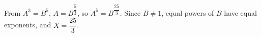 From $A^3=B^5$, $A=B^{\dfrac{5}{3}}$, so $A^5=B^{\dfrac{25}{3}}$. Since $B\ne1$, equal powers of $B$ have equal exponents, and $X=\boxed{\dfrac{25}{3}}$.
